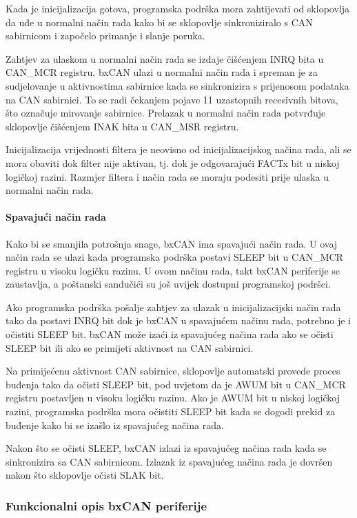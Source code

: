 Kada je inicijalizacija gotova, programska podrška mora zahtijevati od sklopovlja da uđe u normalni način rada kako bi se sklopovlje sinkroniziralo s CAN sabirnicom i započelo primanje i slanje poruka.

Zahtjev za ulaskom u normalni način rada se izdaje čišćenjem INRQ bita u CAN\_MCR registru. bxCAN ulazi u normalni način rada i spreman je za sudjelovanje u aktivnostima sabirnice kada se sinkronizira s prijenosom podataka na CAN sabirnici. To se radi čekanjem pojave 11 uzastopnih recesivnih bitova, što označuje mirovanje sabirnice. Prelazak u normalni način rada potvrđuje sklopovlje čišćenjem INAK bita u CAN\_MSR registru.

Inicijalizacija vrijednosti filtera je neovisno od inicijalizacijskog načina rada, ali se mora obaviti dok filter nije aktivan, tj. dok je odgovarajući FACTx bit u niskoj logičkoj razini. Razmjer filtera i način rada se moraju podesiti prije ulaska u normalni način rada.

\paragraph{Spavajući način rada}

Kako bi se smanjila potrošnja snage, bxCAN ima spavajući način rada. U ovaj način rada se ulazi kada programska podrška postavi SLEEP bit u CAN\_MCR registru u visoku logičku razinu. U ovom načinu rada, takt bxCAN periferije se zaustavlja, a poštanski sandučići su još uvijek dostupni programskoj podršci.

Ako programska podrška pošalje zahtjev za ulazak u inicijalizacijski način rada tako da postavi INRQ bit dok je bxCAN u spavajućem načinu rada, potrebno je i očistiti SLEEP bit. bxCAN može izaći iz spavajućeg načina rada ako se očisti SLEEP bit ili ako se primijeti aktivnost na CAN sabirnici.

Na primijećenu aktivnost CAN sabirnice, sklopovlje automatski provede proces buđenja tako da očisti SLEEP bit, pod uvjetom da je AWUM bit u CAN\_MCR registru postavljen u visoku logičku razinu. Ako je AWUM bit u niskoj logičkoj razini, programska podrška mora očistiti SLEEP bit kada se dogodi prekid za buđenje kako bi se izašlo iz spavajućeg načina rada.

Nakon što se očisti SLEEP, bxCAN izlazi iz spavajućeg načina rada kada se sinkronizira sa CAN sabirnicom. Izlazak iz spavajućeg načina rada je dovršen nakon što sklopovlje očisti SLAK bit.

\subsubsection{Funkcionalni opis bxCAN periferije}

